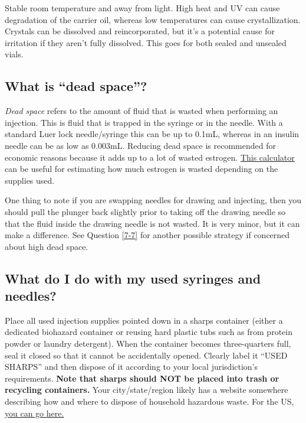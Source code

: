 \documentclass{article}
\begin{document}
Stable room temperature and away from light. High heat and UV can cause degradation of the carrier oil, whereas low temperatures can cause crystallization. Crystals can be dissolved and reincorporated, but it’s a potential cause for irritation if they aren’t fully dissolved. This goes for both sealed and unsealed vials.

\subsection{What is “dead space”?}\label{5-26}

\textit{Dead space} refers to the amount of fluid that is wasted when performing an injection. This is fluid that is trapped in the syringe or in the needle. With a standard Luer lock needle/syringe this can be up to 0.1mL, whereas in an insulin needle can be as low as 0.003mL. Reducing dead space is recommended for economic reasons because it adds up to a lot of wasted estrogen. \href{https://hrtcafe.net/Calc/}{This calculator} can be useful for estimating how much estrogen is wasted depending on the supplies used.

One thing to note if you are swapping needles for drawing and injecting, then you should pull the plunger back slightly prior to taking off the drawing needle so that the fluid inside the drawing needle is not wasted. It is very minor, but it can make a difference. See Question \ref{7-7} for another possible strategy if concerned about high dead space.

\subsection{What do I do with my used syringes and needles?}\label{5-27}

Place all used injection supplies pointed down in a sharps container (either a dedicated biohazard container or reusing hard plastic tubs such as from protein powder or laundry detergent). When the container becomes three-quarters full, seal it closed so that it cannot be accidentally opened. Clearly label it “USED SHARPS” and then dispose of it according to your local jurisdiction's requirements. \textbf{Note that sharps should NOT be placed into trash or recycling containers.} Your city/state/region likely has a website somewhere describing how and where to dispose of household hazardous waste. For the US, \href{https://safeneedledisposal.org/}{you can go here.}
\end{document}
